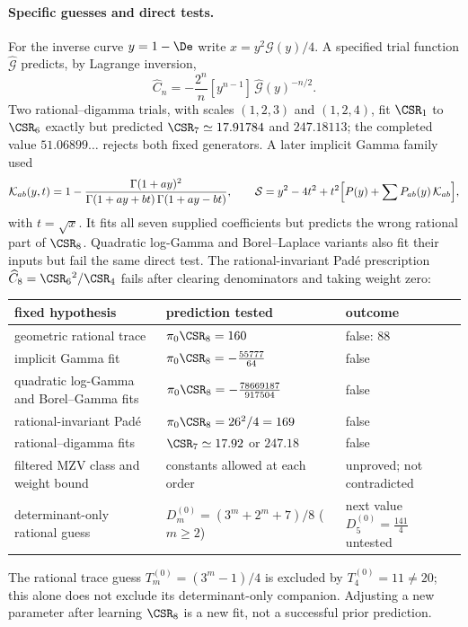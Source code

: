 \paragraph{Specific guesses and direct tests.} For the inverse curve $y=1-\De$ write $x=y^2\mathcal G(y)/4$. A
specified trial function $\widehat{\mathcal G}$ predicts, by Lagrange inversion,
\begin{equation}
 \widehat C_n=-\frac{2^n}{n}[y^{n-1}]\,\widehat{\mathcal G}(y)^{-n/2}.
\end{equation}
Two rational--digamma trials, with scales $(1,2,3)$ and $(1,2,4)$, fit $\CSR_1$ to $\CSR_6$ exactly but predicted
$\CSR_7\simeq17.91784$ and $247.18113$; the completed value $51.06899\ldots$ rejects both fixed generators. A later
implicit Gamma family used
\begin{equation}
 \mathcal K_{ab}(y,t)=1-\frac{\Gamma(1+ay)^2}{\Gamma(1+ay+bt)\,\Gamma(1+ay-bt)},\qquad
 \mathcal S=y^2-4t^2+t^2\Bigl[P(y)+\sum P_{ab}(y)\,\mathcal K_{ab}\Bigr],
\end{equation}
with $t=\sqrt x$. It fits all seven supplied coefficients but predicts the wrong rational part of $\CSR_8$. Quadratic
log-Gamma and Borel--Laplace variants also fit their inputs but fail the same direct test. The rational-invariant
Pad\'e prescription $\widehat C_8=\CSR_6{}^2/\CSR_4$ fails after clearing denominators and taking weight zero:
\begin{center}\small
\begin{tabular}{@{}>{\raggedright\arraybackslash}p{}>{\raggedright\arraybackslash}p{}>{\raggedright\arraybackslash}p{}@{}}
\toprule
fixed hypothesis & prediction tested & outcome\\
\midrule
geometric rational trace & $\pi_0\CSR_8=160$ & false: $88$\\
implicit Gamma fit & $\pi_0\CSR_8=-\frac{55777}{64}$ & false\\
quadratic log-Gamma and Borel--Gamma fits & $\pi_0\CSR_8=-\frac{78669187}{917504}$ & false\\
rational-invariant Pad\'e & $\pi_0\CSR_8=26^2/4=169$ & false\\
rational--digamma fits & $\CSR_7\simeq17.92$ or $247.18$ & false\\
filtered MZV class and weight bound & constants allowed at each order & unproved; not contradicted\\
determinant-only rational guess & $D_m^{(0)}=(3^m+2^m+7)/8$ ($m\ge2$) & next value $D_5^{(0)}=\frac{141}{4}$ untested\\
\bottomrule
\end{tabular}
\end{center}
The rational trace guess $T_m^{(0)}=(3^m-1)/4$ is excluded by $T_4^{(0)}=11\ne20$; this alone does not exclude its
determinant-only companion. Adjusting a new parameter after learning $\CSR_8$ is a new fit, not a successful prior
prediction.

